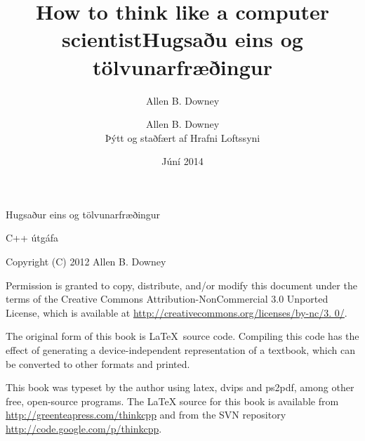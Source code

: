 \documentclass{book}
\title{How to think like a computer scientist}
\author{Allen B. Downey}
\date{}
\begin{document}
\title {Hugsaðu eins og tölvunarfræðingur}
\author {Allen B. Downey \\
Þýtt og staðfært af Hrafni Loftssyni}
\date {Júní 2014}
\maketitle

\vspace{2in}
\begin{center}
{\Large Hugsaður eins og tölvunarfræðingur}

C++ útgáfa
\vspace{0.25in}

Copyright (C) 2012  Allen B. Downey
\end{center}
\vspace{0.25in}

Permission is granted to copy, distribute, and/or modify this document
under the terms of the Creative Commons Attribution-NonCommercial 3.0 Unported
License, which is available at \url{http://creativecommons.org/licenses/by-nc/3.
0/}.

The original form of this book is \LaTeX\ source code.  Compiling this
code has the effect of generating a device-independent representation
of a textbook, which can be converted to other formats and printed.

This book was typeset by the author using latex, dvips and ps2pdf,
among other free, open-source programs.
The LaTeX source for this book is available from
\url{http://greenteapress.com/thinkcpp} and from the SVN repository
\url{http://code.google.com/p/thinkcpp}.


\frontmatter
\tableofcontents

\mainmatter
















\appendix


\printindex
\end{document}
